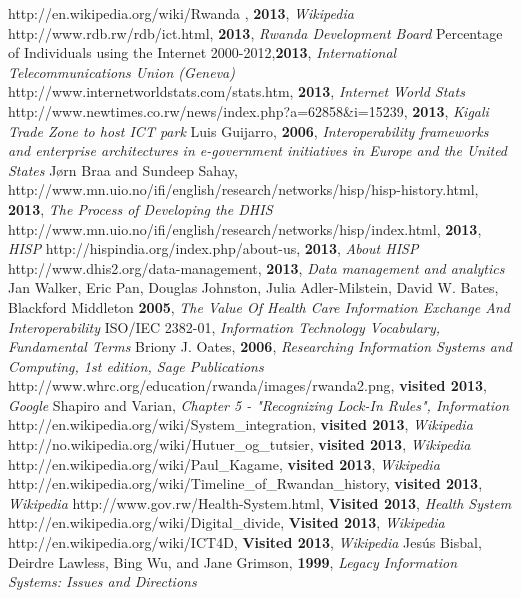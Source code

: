 \begin{thebibliography}{99}
http://en.wikipedia.org/wiki/Rwanda , {\bfseries 2013}, {\itshape Wikipedia}
http://www.rdb.rw/rdb/ict.html, {\bfseries 2013}, {\itshape Rwanda Development Board}
Percentage of Individuals using the Internet 2000-2012,{\bfseries 2013}, {\itshape International Telecommunications Union (Geneva)}
http://www.internetworldstats.com/stats.htm, {\bfseries 2013}, {\itshape Internet World Stats}
http://www.newtimes.co.rw/news/index.php?a=62858\&i=15239, {\bfseries 2013}, {\itshape Kigali Trade Zone to host ICT park}
Luis Guijarro, {\bfseries 2006}, {\itshape Interoperability frameworks and enterprise architectures in e-government initiatives in Europe and the United States}
Jørn Braa and Sundeep Sahay, http://www.mn.uio.no/ifi/english/research/networks/hisp/hisp-history.html, {\bfseries 2013}, {\itshape The Process of Developing the DHIS}
http://www.mn.uio.no/ifi/english/research/networks/hisp/index.html, {\bfseries 2013}, {\itshape HISP}
http://hispindia.org/index.php/about-us, {\bfseries 2013}, {\itshape About HISP}
http://www.dhis2.org/data-management, {\bfseries 2013}, {\itshape Data management and analytics}
Jan Walker, Eric Pan, Douglas Johnston, Julia Adler-Milstein, David W. Bates, Blackford Middleton {\bfseries 2005}, {\itshape The Value Of Health Care Information Exchange And Interoperability}
ISO/IEC 2382-01, {\itshape Information Technology Vocabulary, Fundamental Terms}
Briony J. Oates, {\bfseries 2006}, {\itshape Researching Information Systems and Computing, 1st edition, Sage Publications}
http://www.whrc.org/education/rwanda/images/rwanda2.png, {\bfseries visited 2013}, {\itshape Google}
Shapiro and Varian, {\itshape Chapter 5 - "Recognizing Lock-In Rules", Information}	
http://en.wikipedia.org/wiki/System\_integration, {\bfseries visited 2013}, {\itshape Wikipedia}
http://no.wikipedia.org/wiki/Hutuer\_og\_tutsier, {\bfseries visited 2013}, {\itshape Wikipedia}
http://en.wikipedia.org/wiki/Paul\_Kagame, {\bfseries visited 2013}, {\itshape Wikipedia}
http://en.wikipedia.org/wiki/Timeline\_of\_Rwandan\_history, {\bfseries visited 2013}, {\itshape Wikipedia}
http://www.gov.rw/Health-System.html, {\bfseries Visited 2013}, {\itshape Health System}
http://en.wikipedia.org/wiki/Digital\_divide, {\bfseries Visited 2013}, {\itshape Wikipedia}
http://en.wikipedia.org/wiki/ICT4D, {\bfseries Visited 2013}, {\itshape Wikipedia}
Jesús Bisbal, Deirdre Lawless, Bing Wu, and Jane Grimson, {\bfseries 1999}, {\itshape Legacy Information Systems: Issues and Directions}
\end{thebibliography}